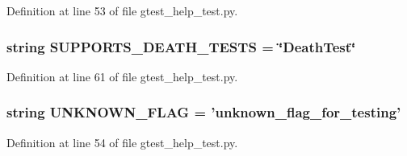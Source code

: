 \-Definition at line 53 of file gtest\-\_\-help\-\_\-test.\-py.

\hypertarget{namespacegtest__help__test_ab164861804ce21115e617dfbe5788ad4}{
\subsubsection[{\-S\-U\-P\-P\-O\-R\-T\-S\-\_\-\-D\-E\-A\-T\-H\-\_\-\-T\-E\-S\-T\-S}]{\setlength{\rightskip}{0pt plus 5cm}string {\bf \-S\-U\-P\-P\-O\-R\-T\-S\-\_\-\-D\-E\-A\-T\-H\-\_\-\-T\-E\-S\-T\-S} = \char`\"{}\-Death\-Test\char`\"{}}}\label{de/dbf/namespacegtest__help__test_ab164861804ce21115e617dfbe5788ad4}


\-Definition at line 61 of file gtest\-\_\-help\-\_\-test.\-py.

\hypertarget{namespacegtest__help__test_a1c3a22aa6e1c78f2f91c9de0c07f78c9}{
\subsubsection[{\-U\-N\-K\-N\-O\-W\-N\-\_\-\-F\-L\-A\-G}]{\setlength{\rightskip}{0pt plus 5cm}string {\bf \-U\-N\-K\-N\-O\-W\-N\-\_\-\-F\-L\-A\-G} = 'unknown\-\_\-flag\-\_\-for\-\_\-testing'}}\label{de/dbf/namespacegtest__help__test_a1c3a22aa6e1c78f2f91c9de0c07f78c9}


\-Definition at line 54 of file gtest\-\_\-help\-\_\-test.\-py.

